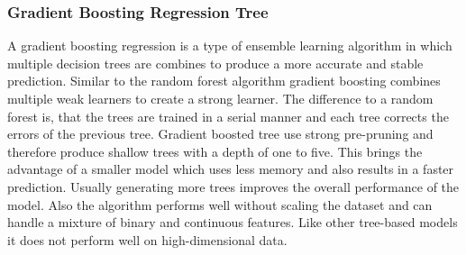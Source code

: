 



\subsubsection{Gradient Boosting Regression Tree}
A gradient boosting regression is a type of ensemble learning algorithm in which multiple decision trees are combines
to produce a more accurate and stable prediction. Similar to the random forest algorithm gradient boosting combines
multiple weak learners to create a strong learner.
The difference to a random forest is, that the trees are trained in a serial manner and each tree corrects the errors
of the previous tree. \cite[p. 88-89]{muller_introductionmachinelearning_2016}
Gradient boosted tree use strong pre-pruning and therefore produce shallow trees with a depth of one to five. This
brings the advantage of a smaller model which uses less memory and also results in a faster prediction.
Usually generating more trees improves the overall performance of the model. \cite[p.
88-89]{muller_introductionmachinelearning_2016}
Also the algorithm performs well without scaling the dataset and can handle a mixture of binary and continuous
features. \cite[p. 88-89]{muller_introductionmachinelearning_2016}
Like other tree-based models it does not perform well on high-dimensional data.

